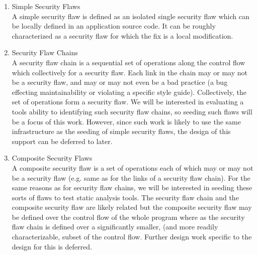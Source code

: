       \begin{enumerate}
         \item Simple Security Flaws \\ 
               A simple security flaw is defined as an isolated single security flaw
               which can be locally defined in an application source code. It can be
               roughly characterized as a security flaw for which the fix is a local 
               modification.

         \item Security Flaw Chains \\ 
               A security flaw chain is a sequential set of operations along the control
               flow which collectively for a security flaw.  Each link in the chain may or
               may not be a security flaw, and may or may not even be a bad practice (a
               bug effecting maintainability or violating a specific style guide).
               Collectively, the set of operations form a security flaw.  We will be
               interested in evaluating a tools ability to identifying such security flaw 
               chains, so seeding such flaws will be a focus of this work. However,
               since such work is likely to use the same infrastructure as the 
               seeding of simple security flaws, the design of this support can be
               deferred to later.

         \item Composite Security Flaws \\
               A composite security flaw is a set of operations each of which may or 
               may not be a security flaw (e.g. same as for the links of a security flaw
               chain).  For the same reasons as for security flaw chains, we will be
               interested in seeding these sorts of flaws to test static analysis tools.
               The security flaw chain and the composite security flaw are likely related
               but the composite security flaw may be defined over the control flow of the
               whole program where as the security flaw chain is defined over a
               significantly smaller, (and more readily characterizable, subset of the
               control flow. Further design work specific to the design for this is
               deferred.
      \end{enumerate}




